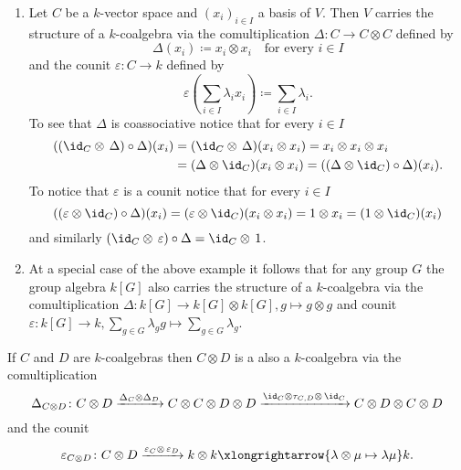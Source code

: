 \begin{examples}
 \begin{enumerate}[leftmargin=*]
  \item
   Let $C$ be a $k$-vector space and $(x_i)_{i \in I}$ a basis of $V$. Then $V$ carries the structure of a $k$-coalgebra via the comultiplication $\Delta \colon C \to C \otimes C$ defined by
   \[
    \Delta(x_i) \coloneqq x_i \otimes x_i \quad \text{for every $i \in I$}
   \]
   and the counit $\varepsilon \colon C \to k$ defined by
   \[
    \varepsilon\left( \sum_{i \in I} \lambda_i x_i \right) \coloneqq \sum_{i \in I} \lambda_i.
   \]
   To see that $\Delta$ is coassociative notice that for every $i \in I$
   \begin{align*}
     ((\id_C \otimes\, \Delta) \circ \Delta)(x_i)
     &= (\id_C \otimes\, \Delta)(x_i \otimes x_i)
     = x_i \otimes x_i \otimes x_i \\
     &= (\Delta \otimes \id_C)(x_i \otimes x_i)
     = ((\Delta \otimes \id_C) \circ \Delta)(x_i).
   \end{align*}
   To notice that $\varepsilon$ is a counit notice that for every $i \in I$
   \[
     ((\varepsilon \otimes \id_C) \circ \Delta)(x_i)
     = (\varepsilon \otimes \id_C)(x_i \otimes x_i)
     = 1 \otimes x_i
     = (1 \otimes \id_C)(x_i)
   \]
   and similarly $(\id_C \otimes\, \varepsilon) \circ \Delta = \id_C \otimes\, 1$.
   
  \item
   At a special case of the above example it follows that for any group $G$ the group algebra $k[G]$ also carries the structure of a $k$-coalgebra via the comultiplication $\Delta \colon k[G] \to k[G] \otimes k[G], g \mapsto g \otimes g$ and counit $\varepsilon \colon k[G] \to k, \sum_{g \in G} \lambda_g g \mapsto \sum_{g \in G} \lambda_g$.
 \end{enumerate}
\end{examples}


\begin{example}
 If $C$ and $D$ are $k$-coalgebras then $C \otimes D$ is a also a $k$-coalgebra via the comultiplication
 \[
  \Delta_{C \otimes D} \colon
  C \otimes D
  \xrightarrow{\Delta_C \otimes \Delta_D}
  C \otimes C \otimes D \otimes D
  \xrightarrow{\id_C \otimes \tau_{C,D} \otimes\, \id_C}
  C \otimes D \otimes C \otimes D
 \]
 and the counit
 \[
  \varepsilon_{C \otimes D} \colon
  C \otimes D
  \xrightarrow{\varepsilon_C \otimes\, \varepsilon_D}
  k \otimes k
  \xlongrightarrow{\lambda \otimes \mu \mapsto \lambda \mu}
  k.
 \]
\end{example}


